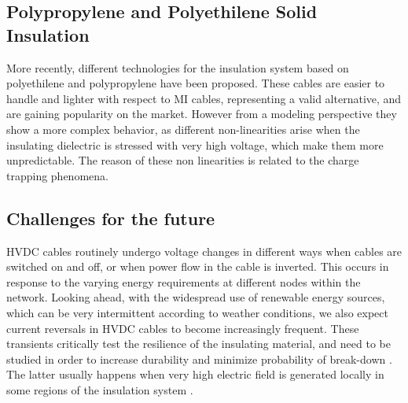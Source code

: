 \documentclass[11pt,a4paper]{article}
\begin{document}
\subsection{Polypropylene and Polyethilene Solid Insulation}
More recently, different technologies for the insulation system based on polyethilene and polypropylene have been proposed. These cables are easier to handle and lighter with respect to MI cables, representing a valid alternative, and are gaining popularity on the market. However from a modeling perspective they show a more complex behavior, as different non-linearities arise when the insulating dielectric is stressed with very high voltage, which make them more unpredictable. The reason of these non linearities is related to the charge trapping phenomena.
\subsection{Challenges for the future}
HVDC cables routinely undergo voltage changes in different ways when cables are switched on and off, or when power flow in the cable is inverted. This occurs in response to the varying energy requirements at different nodes within the network. Looking ahead, with the widespread use of renewable energy sources, which can be very intermittent according to weather conditions, we also expect current reversals in HVDC cables to become increasingly frequent. These transients critically test the resilience of the insulating material, and need to be studied in order to increase durability and minimize probability of break-down \cite{hakonseththesis}. The latter usually happens when very high electric field is generated locally in some regions of the insulation system \cite{9474605}.
\end{document}
